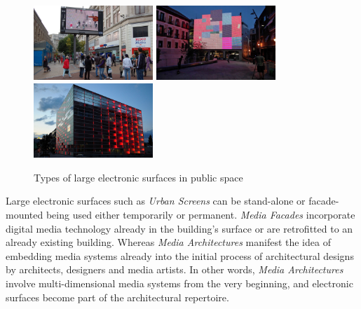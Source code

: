\begin{figure} [h!]
    \centering
        \includegraphics[width=4.5cm]{Illustrations/3.jpg}
        \includegraphics[width=4.5cm]{Illustrations/2.jpeg}
        \includegraphics[width=4.5cm]{Illustrations/1.jpg}
    \caption[Types of electronic surfaces]{Types of large electronic surfaces in public space}
    \label{TypesOfSurfaces}
\end{figure}


Large electronic surfaces such as \textit{Urban Screens} can be stand-alone or facade-mounted being used either temporarily or permanent. 
\textit{Media Facades} incorporate digital media technology already in the building’s surface or are retrofitted to an already existing building. 
Whereas \textit{Media Architectures} manifest the idea of embedding media systems already into the initial process of architectural designs by architects, designers and media artists. In other words, \textit{Media Architectures} involve multi-dimensional media systems from the very beginning, and electronic surfaces become part of the architectural repertoire.

